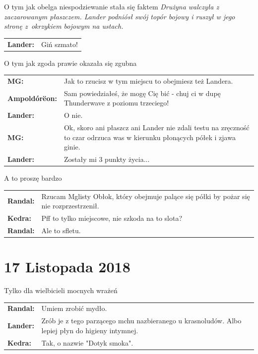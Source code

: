 \documentclass[10pt,twoside,twocolumn]{book}
\begin{document}
\begin{rpg-quotebox}{O tym jak obelga niespodziewanie stała się faktem}
   \textit{Drużyna walczyła z zaczarowanym płaszczem. Lander podniósł swój topór bojowy i ruszył w jego stronę z~okrzykiem bojowym na ustach.}\\

   \begin{tabularx}{\columnwidth}{lX}
      \textbf{Lander:} & Giń szmato!\\
   \end{tabularx}
\end{rpg-quotebox}


\begin{rpg-quotebox}{O tym jak zgoda prawie okazała się zgubna}
   \begin{tabularx}{\columnwidth}{lX}
      \textbf{MG:} & Jak to rzucisz w tym miejscu to obejmiesz też Landera.\\
      \textbf{Ampoldórëon:} & Sam powiedziałeś, że mogę Cię bić - chuj ci w dupę Thunderwave z poziomu trzeciego!\\
      \textbf{Lander:} & O nie.\\
      \textbf{MG:} & Ok, skoro ani płaszcz ani Lander nie zdali testu na zręczność to czar odrzuca was w kierunku płonących półek i zjawa ginie.\\
      \textbf{Lander:} & Zostały mi 3 punkty życia...\\
   \end{tabularx}
\end{rpg-quotebox}


\begin{rpg-quotebox}{A to proszę bardzo}
   \begin{tabularx}{\columnwidth}{lX}
      \textbf{Randal:} & Rzucam Mglisty Obłok, który obejmuje palące się półki by pożar się nie rozprzestrzenił.\\
      \textbf{Kedra:} & Pff to tylko miejscowe, nie szkoda na to slota?\\
      \textbf{Randal:} & Ale to sfletu.\\
   \end{tabularx}
\end{rpg-quotebox}


\section*{17 Listopada 2018}


\begin{rpg-quotebox}{Tylko dla wielbicieli mocnych wrażeń}
   \begin{tabularx}{\columnwidth}{lX}
      \textbf{Randal:} & Umiem zrobić mydło.\\
      \textbf{Lander:} & Zrób je z tego parzącego mchu nazbieranego u krasnoludów. Albo lepiej płyn do higieny intymnej.\\
      \textbf{Kedra:} & Tak, o nazwie "Dotyk smoka".\\
   \end{tabularx}
\end{rpg-quotebox}
\end{document}
